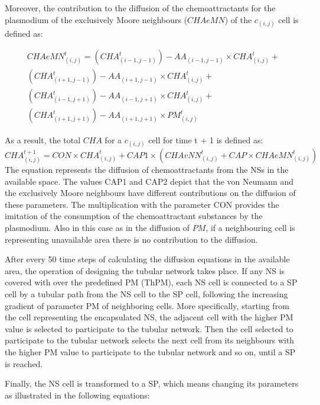Moreover, the contribution to the diffusion of the chemoattractants for the plasmodium of the exclusively Moore neighbours ($CHAeMN$) of the $c_{(i,j)}$ cell is defined as:

\begin{equation}
\begin{split}
CHAeMN^t_{(i, j)} = 
(CHA^t_{(i-1, j-1)}) - AA_{(i-1, j-1)} \times CHA^t_{(i, j)} +
\\(CHA^t_{(i+1, j-1)}) - AA_{(i+1, j-1)} \times CHA^t_{(i, j)} +
\\(CHA^t_{(i-1, j+1)}) - AA_{(i-1, j+1)} \times CHA^t_{(i, j)}  +
\\(CHA^t_{(i+1, j+1)}) - AA_{(i+1, j+1)} \times PM^t_{(i, j)}
\end{split}
\end{equation}

As a result, the total $CHA$ for a $c_{(i,j)}$ cell for time t + 1 is defined as:
\begin{equation}
CHA^{t+1}_{(i, j)} = CON \times {CHA^t_{(i, j)} + CAP1 \times (CHAvNN^t_{(i, j)} + CAP \times CHAeMN^t_{(i, j)})}
\end{equation}
The equation represents the diffusion of chemoattractants from the NSs in the available space. The values CAP1 and CAP2 depict that the von Neumann and the exclusively Moore neighbours have different contributions on the diffusion of these parameters. The multiplication with the parameter CON provides the imitation of the consumption of the chemoattractant substances by the plasmodium. Also in this case as in the diffusion of $PM$, if a neighbouring cell is representing unavailable area there is no contribution to the diffusion.

\par
After every 50 time steps of calculating the diffusion equations in the available area, the operation of designing the tubular network takes place. If any NS is covered with over the predefined PM (ThPM), each NS cell is connected to a SP cell by a tubular path from the NS cell to the SP cell, following the increasing gradient of parameter PM of neighboring cells. 
More specifically, starting from the cell representing the encapsulated NS, the adjacent cell with the higher PM value is selected to participate to the tubular network. Then the cell selected to participate to the tubular network selects the next cell from its neighbours with the higher PM value to participate to the tubular network and so on, until a SP is reached.

\par
Finally, the NS cell is transformed to a SP, which means changing its parameters as illustrated in the following equations:

